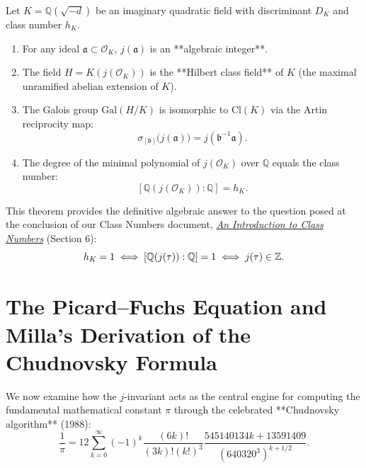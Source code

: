 \documentclass[a4paper]{article}
\begin{document}
\begin{theorem}
Let $K = \mathbb{Q}(\sqrt{-d})$ be an imaginary quadratic field with discriminant $D_K$ and class number $h_K$.
\begin{enumerate}[label=(\roman*)]
 \item For any ideal $\mathfrak{a} \subset \mathcal{O}_K$, $j(\mathfrak{a})$ is an **algebraic integer**.
 \item The field $H = K(j(\mathcal{O}_K))$ is the **Hilbert class field** of $K$ (the maximal unramified abelian extension of $K$).
 \item The Galois group $\mathrm{Gal}(H/K)$ is isomorphic to $\mathrm{Cl}(K)$ via the Artin reciprocity map:
 \begin{equation}
  \sigma_{[\mathfrak{b}]} \big(j(\mathfrak{a})\big) = j(\mathfrak{b}^{-1}\mathfrak{a}).
 \end{equation}
 \item The degree of the minimal polynomial of $j(\mathcal{O}_K)$ over $\mathbb{Q}$ equals the class number:
 \begin{equation}
  \boxed{[\mathbb{Q}(j(\mathcal{O}_K)) : \mathbb{Q}] = h_K}.
 \end{equation}
\end{enumerate}
\end{theorem}

This theorem provides the definitive algebraic answer to the question posed at the conclusion of our Class Numbers document, \href{class_numbers_main.pdf}{\emph{An Introduction to Class Numbers}} \cite{kerimov2026class} (Section 6):
\begin{equation}
 h_K = 1 \iff [\mathbb{Q}(j(\tau)) : \mathbb{Q}] = 1 \iff j(\tau) \in \mathbb{Z}.
\end{equation}

\section{The Picard--Fuchs Equation and Milla's Derivation of the Chudnovsky Formula}
\label{sec:milla_chudnovsky}

We now examine how the $j$-invariant acts as the central engine for computing the fundamental mathematical constant $\pi$ through the celebrated **Chudnovsky algorithm** (1988):
\begin{equation}
 \frac{1}{\pi} = 12 \sum_{k=0}^{\infty} (-1)^k \frac{(6k)!}{(3k)! (k!)^3} \frac{545140134k + 13591409}{\left(640320^3\right)^{k + 1/2}}.
 \label{eq:chudnovsky_full}
\end{equation}
\end{document}
